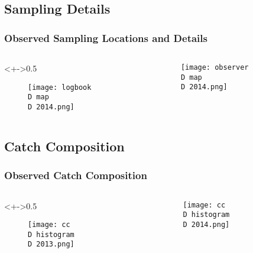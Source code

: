 \subsection{Sampling Details}
%
\begin{frame}
\frametitle{Observed Sampling Locations and Details}
\begin{columns}
\begin{column}<+->{0.5\textwidth}
 \vspace*{-0.5cm}
\begin{figure}
\centerline{\texttt{[image: logbook\\D map\\D 2014.png]}}

\end{figure}
\end{column}

\begin{column}{0.5\textwidth}
\begin{figure}
 \vspace*{-0.5cm}

\centerline{\texttt{[image: observer\\D map\\D 2014.png]}}

 \end{figure}

\end{column}
\end{columns}
%
%
%
%
%
%
%
\end{frame}
%
%
\subsection{Catch Composition}
%
%
\begin{frame}
\frametitle{Observed Catch Composition}
%
\begin{columns}
\begin{column}<+->{0.5\textwidth}
%
\begin{figure}
\centerline{\texttt{[image: cc\\D histogram\\D 2013.png]}}
%
\end{figure}
\end{column}
%
\begin{column}{0.5\textwidth}
\begin{figure}
%

\centerline{\texttt{[image: cc\\D histogram\\D 2014.png]}}
%
\end{figure}
%
\end{column}
\end{columns}
%
\end{frame}

